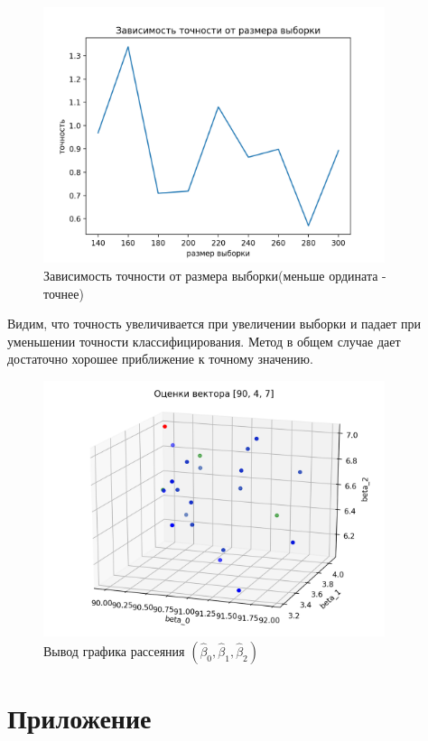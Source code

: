 \documentclass[a4paper,14pt]{extarticle}
\begin{document}
\begin{figure}[h]
    \centering
    \includegraphics[width=100mm]{pics/plot_90_4_accuracy-samplesize.png}
    \caption{Зависимость точности от размера выборки(меньше ордината - точнее)\label{overflow}}
    \label{pic_3}
\end{figure}
Видим, что точность увеличивается при увеличении выборки и падает при уменьшении точности классифицирования. Метод в общем случае дает достаточно хорошее приближение к точному значению.
\newpage
\begin{figure}[h]
    \centering
    \includegraphics[width=100mm]{pics/plot_90_4_7_(2).png}
    \caption{Вывод графика рассеяния $(\hat{\beta}_0,\hat{\beta}_1, \hat{\beta}_2)$\label{overflow}}
    \label{pic_3}
\end{figure}
\break
\newpage
\section{Приложение}
\end{document}
